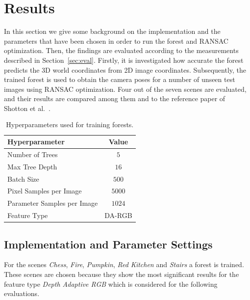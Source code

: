 \documentclass[final]{cvpr}
\begin{document}

\section{Results}
In this section we give some background on the implementation and the parameters that have been chosen in order to 
run the forest and RANSAC optimization. Then, the findings are evaluated according to the measurements described
in Section~\ref{sec:eval}. Firstly, it is investigated how accurate the 
forest predicts the 3D world coordinates from 2D image coordinates. Subsequently, the trained forest is used to obtain 
the camera poses for a number of unseen test images using RANSAC optimization. Four out of the seven scenes 
are evaluated, and their results are compared among them and to the reference paper of Shotton et al.~\cite{shotton2013}. 

\begin{table}[h!]
	\begin{center}
	\begin{tabular}{|l|c|}
	\hline
	Hyperparameter & Value \\
	\hline\hline
	Number of Trees & $5$ \\
	Max Tree Depth & $16$ \\
	Batch Size & $500$ \\
	Pixel Samples per Image & $5000$ \\
	Parameter Samples per Image  & $1024$ \\
	Feature Type & DA-RGB \\
	\hline
	\end{tabular}
	\end{center}
	\caption{Hyperparameters used for training forests.}
	\label{tab:params-forest}
\end{table}

\subsection{Implementation and Parameter Settings}
For the scenes \textit{Chess}, \textit{Fire},  \textit{Pumpkin},  \textit{Red Kitchen} and  \textit{Stairs} a forest is
trained. These scenes are chosen because they show the most significant results for the feature type \textit{Depth Adaptive RGB} 
which is considered for the following evaluations.
\end{document}
